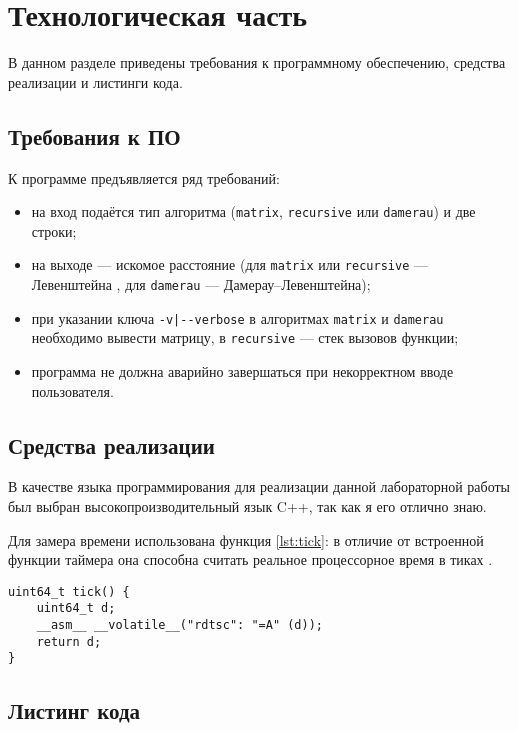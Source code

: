 \chapter{Технологическая часть}

В данном разделе приведены требования к программному обеспечению, средства реализации и листинги кода.

\section{Требования к ПО}

К программе предъявляется ряд требований:
\begin{itemize}
	\item на вход подаётся тип алгоритма (\texttt{matrix}, \texttt{recursive} или \texttt{damerau}) и две строки;
	\item на выходе — искомое расстояние (для \texttt{matrix} или \texttt{recursive} — Левенштейна , для \texttt{damerau} — Дамерау--Левенштейна);
	\item при указании ключа \texttt{-v|{-}-verbose} в алгоритмах \texttt{matrix} и \texttt{damerau} необходимо вывести матрицу, в \texttt{recursive} — стек вызовов функции;
	\item программа не должна аварийно завершаться при некорректном вводе пользователя.
\end{itemize}

\section{Средства реализации}

В качестве языка программирования для реализации данной лабораторной работы был выбран высокопроизводительный язык C++, так как я его отлично знаю.

Для замера времени использована функция \ref{lst:tick}: в отличие от встроенной функции таймера она способна считать реальное процессорное время в тиках \cite{Kurnosov}.

\begin{lstlisting}[caption={Функция замера процессорного времени},label={lst:tick},style={cpp}]
uint64_t tick() {
	uint64_t d;
	__asm__ __volatile__("rdtsc": "=A" (d));
	return d;
}
\end{lstlisting}
\section{Листинг кода}

